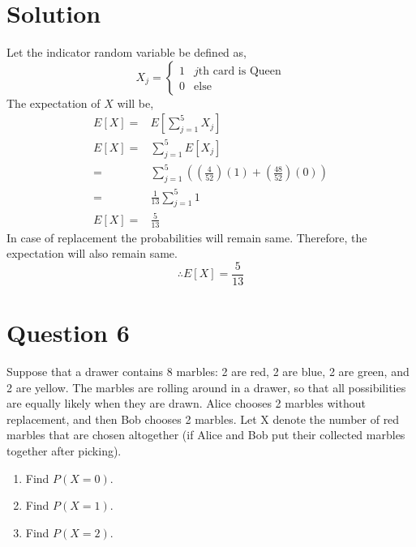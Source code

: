 \documentclass[a4paper, 11pt]{article}
\begin{document}
\section*{Solution}
Let the indicator random variable be defined as,
\[
    X_{j}= \begin{cases}
        1 & j\text{th card is Queen} \\
        0 & \text{else}
    \end{cases}
\]
The expectation of $X$ will be,
\begin{equation*}
    \begin{split}
        E[X]=&E\left[\sum_{j=1}^{5}X_{j}\right]\\
        E[X]=&\sum_{j=1}^{5}E[X_{j}]\\
        =&\sum_{j=1}^{5}\left(\left(\frac{4}{52}\right)(1)+(\frac{48}{52})(0)\right)\\
        =&\frac{1}{13}\sum_{j=1}^{5}1\\
        E[X]=&\frac{5}{13}
    \end{split}
\end{equation*}
In case of replacement the probabilities will remain same. Therefore, the expectation will also remain same.
\[\therefore E[X]=\frac{5}{13}\]

\break
\section*{Question 6} Suppose that a drawer contains 8 marbles: 2 are red, 2 are blue, 2 are green, and 2 are yellow. The marbles are rolling around in a drawer, so that all possibilities are equally likely when they are drawn. Alice chooses 2 marbles without replacement, and then Bob chooses
2 marbles. Let X denote the number of red marbles that are chosen altogether (if Alice and Bob put their collected marbles together after picking).
\begin{enumerate}[label=(\alph*)]
    \item Find $P(X = 0)$.
    \item Find $P(X = 1)$.
    \item Find $P(X = 2)$.
\end{enumerate}
\end{document}

